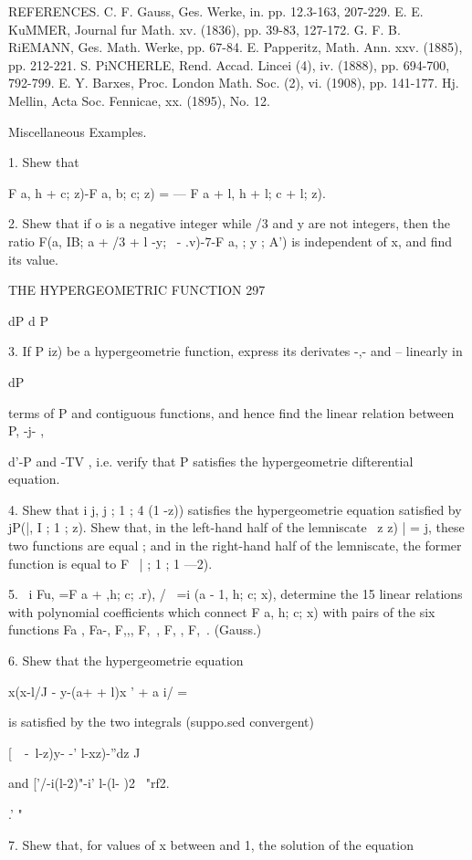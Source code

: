 REFERENCES. C. F. Gauss, Ges. Werke, in. pp. 12.3-163, 207-229. E. E.
KuMMER, Journal fur Math. xv. (1836), pp. 39-83, 127-172. G. F. B.
RiEMANN, Ges. Math. Werke, pp. 67-84. E. Papperitz, Math. Ann. xxv.
(1885), pp. 212-221. S. PiNCHERLE, Rend. Accad. Lincei (4), iv.
(1888), pp. 694-700, 792-799. E. Y. Barxes, Proc. London Math. Soc.
(2), vi. (1908), pp. 141-177. Hj. Mellin, Acta Soc. Fennicae, xx.
(1895), No. 12.

Miscellaneous Examples.

1. Shew that

F a, h + \; c; z)-F a, b; c; z) = — F a + l, h + l; c + l; z).

2. Shew that if o is a negative integer while /3 and y are not
integers, then the ratio F(a, IB; a + /3 + l -y; \ - .v)-7-F a, ; y ;
A') is independent of x, and find its value.



THE HYPERGEOMETRIC FUNCTION 297

dP d P

3. If P iz) be a hypergeometrie function, express its derivates -,-
and -- linearly in

dP

terms of P and contiguous functions, and hence find the linear
relation between P, -j- ,

d'-P and -TV , i.e. verify that P satisfies the hypergeometrie
difterential equation.

4. Shew that i j, j ; 1 ; 4 (1 -z)) satisfies the hypergeometrie
equation satisfied by jP(|, I ; 1 ; z). Shew that, in the left-hand
half of the lemniscate \ z z) | = j, these two functions are equal ;
and in the right-hand half of the lemniscate, the former function is
equal to F \, | ; 1 ; 1 —2).

5. \ i Fu, =F a + ,h; c; .r), / \ =i (a - 1, h; c; x), determine the
15 linear relations with polynomial coefficients which connect F a, h;
c; x) with pairs of the six functions Fa , Fa-, F,,, F,\ , F, , F,\ .
(Gauss.)

6. Shew that the hypergeometrie equation

x(x-l/J - y-(a+ + l)x ' + a i/ =

is satisfied by the two integrals (suppo.sed convergent)

[\ \ -\ l-z)y- -' l-xz)-''dz J

and ['/-i(l-2)"-i' l-(l- )2 ~"rf2.

.' "

7. Shew that, for values of x between and 1, the solution of the
equation

